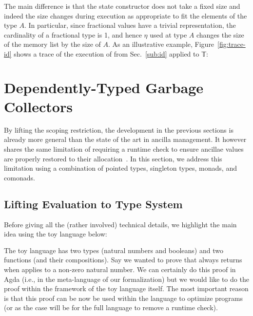 \documentclass[sigplan,10pt,review,anonymous]{acmart}
\begin{document}
\PIFMEMstep{}

The main difference is that the state constructor does not take a
fixed size and indeed the size changes during execution as appropriate
to fit the elements of the type $A$. In particular, since fractional
values have a trivial representation, the cardinality of a fractional
type is 1, and hence $\eta$ used at type $A$ changes the size of the
memory list by the size of $A$. As an illustrative example,
Figure~\ref{fig:trace-id} shows a trace of the execution of 
from Sec.~\ref{sub:id} applied to 𝕋:

{\center}


\section{Dependently-Typed Garbage Collectors}
\label{sec:dep}

By lifting the scoping restriction, the development in the previous
sections is already more general than the state of the art in ancilla
management.  It however shares the same limitation of requiring a
runtime check to ensure ancillae values are properly restored to their
allocation~\cite{10.1007/978-3-319-20860-2_13,Green:2013:QSQ:2491956.2462177}.
In this section, we address this limitation using a combination of
pointed types, singleton types, monads, and comonads.

\subsection{Lifting Evaluation to Type System}

Before giving all the (rather involved) technical details, we
highlight the main idea using the toy language below:

\Jexample{}

The toy language has two types (natural numbers and booleans) and two
functions (and their compositions). Say we wanted to prove that
 always returns
 when applies to a non-zero natural
number. We can certainly do this proof in Agda (i.e., in the
meta-language of our formalization) but we would like to do the proof
within the framework of the toy language itself. The most important
reason is that this proof can be now be used within the language to
optimize programs (or as the case will be for the full language to
remove a runtime check).
\end{document}
